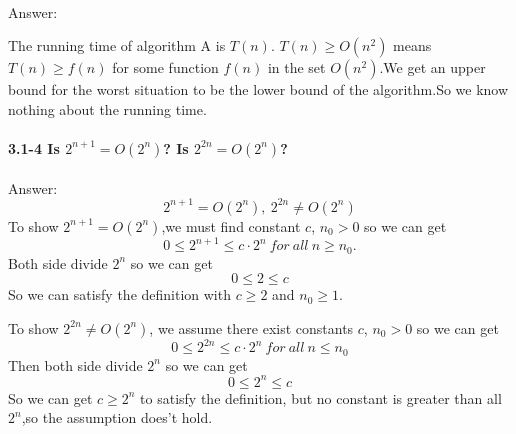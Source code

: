 \documentclass{ctexart}
\begin{document}
			\paragraph*{}
			Answer:

			The running time of algorithm A is $T(n)$. $T(n) \geqslant O(n^2)$ means $T(n) \geqslant f(n)$ for some function $f(n)$ in the set $O(n^2)$.We get an upper bound for the worst situation to be the lower bound of the algorithm.So we know nothing about the running time.
		\paragraph{3.1-4 Is $2^{n+1} = O(2^n)$? Is $2^{2n} = O(2^n)$?}
			\paragraph*{}
			Answer:
			\begin{equation}
				2^{n+1} = O(2^n),\ 2^{2n} \not= O(2^n)\tag{3.4-1}
			\end{equation}
			To show $2^{n+1} = O(2^n)$,we must find constant $c$, $n_0 > 0$ so we can get 
			\begin{equation}
				0 \leqslant 2^{n+1} \leqslant c\cdot 2^n\ for\ all\ n \geqslant n_0.\tag{3.4-2}
			\end{equation}		
			Both side divide $2^n$ so we can get 
			\begin{equation}
				0 \leqslant 2 \leqslant c\tag{3.4-3}
			\end{equation}
			So we can satisfy the definition with $c \geqslant 2$ and $n_0 \geqslant 1$.

			To show $2^{2n} \not=O(2^n)$, we assume there exist constants $c$, $n_0 > 0$ so we can get 
			\begin{equation}
				0 \leqslant 2^{2n} \leqslant c\cdot2^n\ for\ all\ n \leqslant n_0\tag{3.4-4}
			\end{equation}
			Then both side divide $2^n$ so we can get
			\begin{equation}
				0 \leqslant 2^n \leqslant c\tag{3.4-5}
			\end{equation}
			So we can get $c \geqslant 2^n$ to satisfy the definition, but no constant is greater than all $2^n$,so the assumption does't hold.
	
\end{document}
